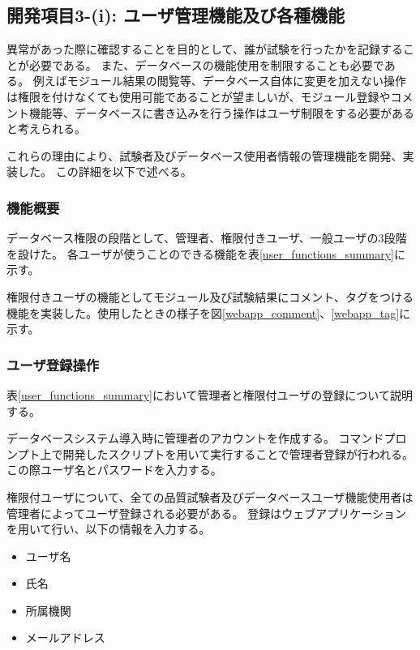 \clearpage

\subsection{開発項目3-(i): ユーザ管理機能及び各種機能}\label{sec:user_management_function}

異常があった際に確認することを目的として、誰が試験を行ったかを記録することが必要である。
また、データベースの機能使用を制限することも必要である。
例えばモジュール結果の閲覧等、データベース自体に変更を加えない操作は権限を付けなくても使用可能であることが望ましいが、モジュール登録やコメント機能等、データベースに書き込みを行う操作はユーザ制限をする必要があると考えられる。

これらの理由により、試験者及びデータベース使用者情報の管理機能を開発、実装した。
この詳細を以下で述べる。

\subsubsection{機能概要}
データベース権限の段階として、管理者、権限付きユーザ、一般ユーザの3段階を設けた。
各ユーザが使うことのできる機能を表\ref{user_functions_summary}に示す。

権限付きユーザの機能としてモジュール及び試験結果にコメント、タグをつける機能を実装した。使用したときの様子を図\ref{webapp_comment}、\ref{webapp_tag}に示す。

\subsubsection{ユーザ登録操作}
表\ref{user_functions_summary}において管理者と権限付ユーザの登録について説明する。

データベースシステム導入時に管理者のアカウントを作成する。
コマンドプロンプト上で開発したスクリプトを用いて実行することで管理者登録が行われる。この際ユーザ名とパスワードを入力する。

権限付ユーザについて、全ての品質試験者及びデータベースユーザ機能使用者は管理者によってユーザ登録される必要がある。
登録はウェブアプリケーションを用いて行い、以下の情報を入力する。
\begin{itemize}
  \item ユーザ名 
  \item 氏名
  \item 所属機関
  \item メールアドレス 
\end{itemize}

